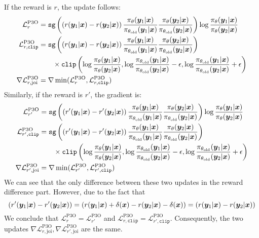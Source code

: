 \documentclass{article} %
\newcommand{\algn}{\text{P3O}}
\begin{document}
If the reward is $r$, the update follows:
\begin{align*}
\mathcal{L}_r^{\algn} &=  \texttt{sg}\left(\left(r(\vy_1|\vx)-r(\vy_2|\vx)\right)\frac{\pi_\theta(\vy_1|\vx)}{\pi_{\theta_{\text{old}}}(\vy_1|\vx)}\frac{\pi_\theta(\vy_2|\vx)}{\pi_{\theta_{\text{old}}}(\vy_2|\vx)}\right)\log\frac{\pi_\theta(\vy_1|\vx)}{\pi_\theta(\vy_2|\vx)}\\
\mathcal{L}^{\algn}_{r,\texttt{clip}} &= \texttt{sg}\left(\left(r(\vy_1|\vx)-r(\vy_2|\vx)\right)\frac{\pi_\theta(\vy_1|\vx)}{\pi_{\theta_{\text{old}}}(\vy_1|\vx)}\frac{\pi_\theta(\vy_2|\vx)}{\pi_{\theta_{\text{old}}}(\vy_2|\vx)}\right) \\
&\quad\quad\times\texttt{clip}\left(\log\frac{\pi_\theta(\vy_1|\vx)}{\pi_\theta(\vy_2|\vx)},\log\frac{\pi_{\theta_\text{old}}(\vy_1|\vx)}{\pi_{\theta_\text{old}}(\vy_2|\vx)}-\epsilon,\log\frac{\pi_{\theta_\text{old}}(\vy_1|\vx)}{\pi_{\theta_\text{old}}(\vy_2|\vx)}+\epsilon\right)\\
\nabla\mathcal{L}^{\algn}_{r,\text{joi}} &= \nabla\min(\mathcal{L}_r^{\algn}, \mathcal{L}^{\algn}_{r,\texttt{clip}})
\end{align*}
Similarly, if the reward is $r'$, the gradient is:
\begin{align*}
\mathcal{L}_{r'}^{\algn} &=  \texttt{sg}\left(\left(r'(\vy_1|\vx)-r'(\vy_2|\vx)\right)\frac{\pi_\theta(\vy_1|\vx)}{\pi_{\theta_{\text{old}}}(\vy_1|\vx)}\frac{\pi_\theta(\vy_2|\vx)}{\pi_{\theta_{\text{old}}}(\vy_2|\vx)}\right)\log\frac{\pi_\theta(\vy_1|\vx)}{\pi_\theta(\vy_2|\vx)}\\
\mathcal{L}^{\algn}_{r',\texttt{clip}} &= \texttt{sg}\left(\left(r'(\vy_1|\vx)-r'(\vy_2|\vx)\right)\frac{\pi_\theta(\vy_1|\vx)}{\pi_{\theta_{\text{old}}}(\vy_1|\vx)}\frac{\pi_\theta(\vy_2|\vx)}{\pi_{\theta_{\text{old}}}(\vy_2|\vx)}\right) \\
&\quad\quad\times\texttt{clip}\left(\log\frac{\pi_\theta(\vy_1|\vx)}{\pi_\theta(\vy_2|\vx)},\log\frac{\pi_{\theta_\text{old}}(\vy_1|\vx)}{\pi_{\theta_\text{old}}(\vy_2|\vx)}-\epsilon,\log\frac{\pi_{\theta_\text{old}}(\vy_1|\vx)}{\pi_{\theta_\text{old}}(\vy_2|\vx)}+\epsilon\right)\\
\nabla\mathcal{L}^{\algn}_{r',\text{joi}} &= \nabla\min(\mathcal{L}_{r'}^{\algn}, \mathcal{L}^{\algn}_{r',\texttt{clip}})
\end{align*}
We can see that the only difference between these two updates in the reward difference part. However, due to the fact that
$$\left(r'({\bm{y}}_1|{\bm{x}})-r'({\bm{y}}_2|{\bm{x}})\right) = \left(r({\bm{y}}_1|{\bm{x}})+\delta({\bm{x}})-r({\bm{y}}_2|{\bm{x}})-\delta({\bm{x}})\right) = \left(r({\bm{y}}_1|{\bm{x}})-r({\bm{y}}_2|{\bm{x}})\right)$$
We conclude that $\mathcal{L}_{r}^{\algn} =\mathcal{L}_{r'}^{\algn} $ and $\mathcal{L}^{\algn}_{r,\texttt{clip}}=\mathcal{L}^{\algn}_{r',\texttt{clip}}$. Consequently, the two updates $\nabla\mathcal{L}^{\algn}_{r,\text{joi}},\nabla\mathcal{L}^{\algn}_{r',\text{joi}}$ are the same.
\end{document}
